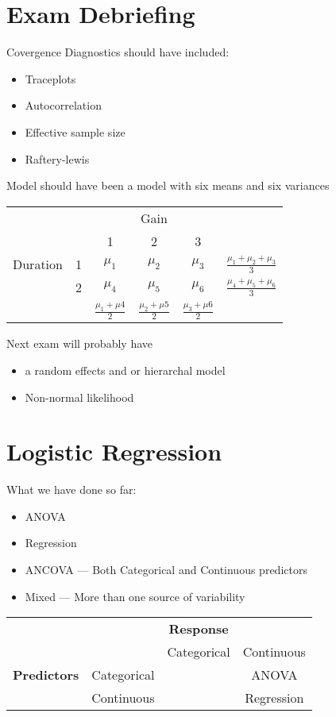 \documentclass[12pt,letterpaper,oneside]{article}\usepackage{graphicx, color}
\begin{document}
\section{Exam Debriefing} %
\label{sec:exam_debriefing}
Covergence Diagnostics should have included:
\begin{itemize}
    \item Traceplots
    \item Autocorrelation
    \item Effective sample size
    \item Raftery-lewis
\end{itemize}
Model should have been a model with six means and six variances

\begin{tabular}{cccccc}
 &  &   & Gain & &\\
 &  & 1 & 2    & 3 &\\
 Duration & 1 &$\mu_{1}$ & $\mu_{2}$& $\mu_{3}$ & $\frac{\mu_{1}+\mu_{2}+\mu_{3}}{3}$ \\
 & 2 &$\mu_{4}$ & $\mu_{5}$& $\mu_{6}$&$\frac{\mu_{4}+\mu_{5}+\mu_{6}}{3}$ \\
 & & $\frac{\mu_{1}+\mu{4}}{2}$ & $\frac{\mu_{2}+\mu{5}}{2}$ & $\frac{\mu_{3}+\mu{6}}{2}$ &
\end{tabular}

Next exam will probably have
\begin{itemize}
    \item a random effects and or hierarchal model
    \item Non-normal likelihood
\end{itemize}
\section{Logistic Regression} %
\label{sec:logistic_regression}
What we have done so far:
\begin{itemize}
    \item ANOVA
    \item Regression
    \item ANCOVA --- Both Categorical and Continuous predictors
    \item Mixed --- More than one source of variability
\end{itemize}

\begin{tabular}{c c| c c}
 &  & \textbf{Response} & \\
 &  & Categorical & Continuous \\
 \hline
 \textbf{Predictors} & Categorical & & ANOVA \\
 & Continuous & & Regression
\end{tabular}
\end{document}
